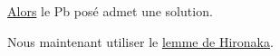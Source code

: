 \uline{Alors} le Pb posé admet une solution.

Nous  maintenant utiliser le \uline{lemme de Hironaka}.
